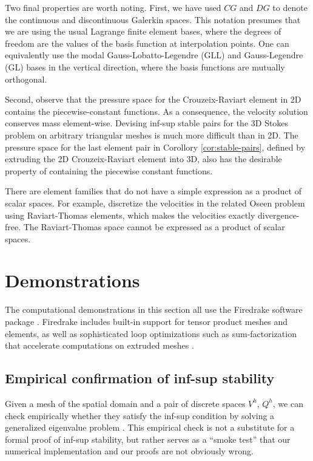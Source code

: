 \documentclass{article}
\theoremstyle{definition}
\theoremstyle{plain}
\begin{document}
Two final properties are worth noting.
First, we have used $CG$ and $DG$ to denote the continuous and discontinuous Galerkin spaces.
This notation presumes that we are using the usual Lagrange finite element bases, where the degrees of freedom are the values of the basis function at interpolation points.
One can equivalently use the modal Gauss-Lobatto-Legendre (GLL) and Gauss-Legendre (GL) bases in the vertical direction, where the basis functions are mutually orthogonal.

Second, observe that the pressure space for the Crouzeix-Raviart element in 2D contains the piecewise-constant functions.
As a consequence, the velocity solution conserves mass element-wise.
Devising inf-sup stable pairs for the 3D Stokes problem on arbitrary triangular meshes is much more difficult than in 2D.
The pressure space for the last element pair in Corollory \ref{cor:stable-pairs}, defined by extruding the 2D Crouzeix-Raviart element into 3D, also has the desirable property of containing the piecewise constant functions.

There are element families that do not have a simple expression as a product of scalar spaces.
For example, \citet{cockburn2007note} discretize the velocities in the related Oseen problem using Raviart-Thomas elements, which makes the velocities exactly divergence-free.
The Raviart-Thomas space cannot be expressed as a product of scalar spaces.



\section{Demonstrations}

The computational demonstrations in this section all use the Firedrake software package \citep{FiredrakeUserManual}.
Firedrake includes built-in support for tensor product meshes and elements, as well as sophisticated loop optimizations such as sum-factorization that accelerate computations on extruded meshes \citep{mcrae2016automated}.

\subsection{Empirical confirmation of inf-sup stability}

Given a mesh of the spatial domain and a pair of discrete spaces $V^h$, $Q^h$, we can check empirically whether they satisfy the inf-sup condition by solving a generalized eigenvalue problem \citep{rognes2012automated}.
This empirical check is not a substitute for a formal proof of inf-sup stability, but rather serves as a ``smoke test'' that our numerical implementation and our proofs are not obviously wrong.
\end{document}
